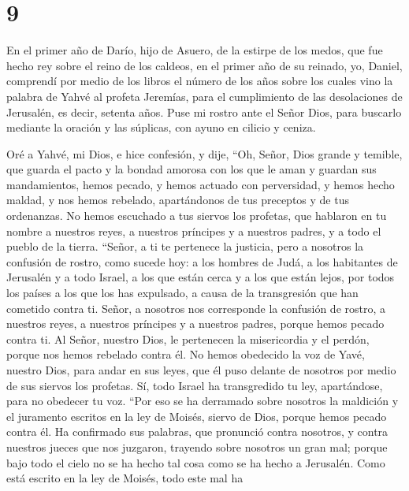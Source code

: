 \hypertarget{section-8}{%
\section{9}\label{section-8}}

 En el primer año de Darío, hijo de Asuero, de la estirpe
de los medos, que fue hecho rey sobre el reino de los caldeos,
 en el primer año de su reinado, yo, Daniel, comprendí por
medio de los libros el número de los años sobre los cuales vino la
palabra de Yahvé al profeta Jeremías, para el cumplimiento de las
desolaciones de Jerusalén, es decir, setenta años.  Puse
mi rostro ante el Señor Dios, para buscarlo mediante la oración y las
súplicas, con ayuno en cilicio y ceniza.

 Oré a Yahvé, mi Dios, e hice confesión, y dije, ``Oh,
Señor, Dios grande y temible, que guarda el pacto y la bondad amorosa
con los que le aman y guardan sus mandamientos,  hemos
pecado, y hemos actuado con perversidad, y hemos hecho maldad, y nos
hemos rebelado, apartándonos de tus preceptos y de tus ordenanzas.
 No hemos escuchado a tus siervos los profetas, que
hablaron en tu nombre a nuestros reyes, a nuestros príncipes y a
nuestros padres, y a todo el pueblo de la tierra. 
``Señor, a ti te pertenece la justicia, pero a nosotros la confusión de
rostro, como sucede hoy: a los hombres de Judá, a los habitantes de
Jerusalén y a todo Israel, a los que están cerca y a los que están
lejos, por todos los países a los que los has expulsado, a causa de la
transgresión que han cometido contra ti.  Señor, a
nosotros nos corresponde la confusión de rostro, a nuestros reyes, a
nuestros príncipes y a nuestros padres, porque hemos pecado contra ti.
 Al Señor, nuestro Dios, le pertenecen la misericordia y
el perdón, porque nos hemos rebelado contra él.  No hemos
obedecido la voz de Yavé, nuestro Dios, para andar en sus leyes, que él
puso delante de nosotros por medio de sus siervos los profetas.
 Sí, todo Israel ha transgredido tu ley, apartándose,
para no obedecer tu voz. ``Por eso se ha derramado sobre nosotros la
maldición y el juramento escritos en la ley de Moisés, siervo de Dios,
porque hemos pecado contra él.  Ha confirmado sus
palabras, que pronunció contra nosotros, y contra nuestros jueces que
nos juzgaron, trayendo sobre nosotros un gran mal; porque bajo todo el
cielo no se ha hecho tal cosa como se ha hecho a Jerusalén.
 Como está escrito en la ley de Moisés, todo este mal ha
